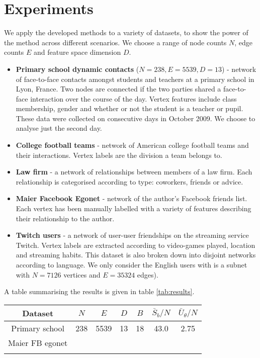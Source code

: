 \section{Experiments}

We apply the developed methods to a variety of datasets, to show the power of the method across different scenarios. We choose a range of node counts $N$, edge counts $E$ and feature space dimension $D$.

\begin{itemize}
	\item \textbf{Primary school dynamic contacts} \cite{schools} ($N=238, E=5539, D=13$) - network of face-to-face contacts amongst students and teachers at a primary school in Lyon, France. Two nodes are connected if the two parties shared a face-to-face interaction over the course of the day. Vertex features include class membership, gender and whether or not the student is a teacher or pupil. These data were collected on consecutive days in October 2009. We choose to analyse just the second day. 
	\item \textbf{College football teams} \cite{Evans_2010_football} - network of American college football teams and their interactions. Vertex labels are the division a team belongs to.
	\item \textbf{Law firm} \cite{LawFirm} - a network of relationships between members of a law firm. Each relationship is categorised according to type: coworkers, friends or advice.
	\item \textbf{Maier Facebook Egonet} \cite{FB-Maier} - network of the author's Facebook friends list. Each vertex has been manually labelled with a variety of features describing their relationship to the author.
	\item \textbf{Twitch users} \cite{twitch} - a network of user-user friendships on the streaming service Twitch. Vertex labels are extracted according to video-games played, location and streaming habits. This dataset is also broken down into disjoint networks according to language. We only consider the English users with is a subnet with $N=7126$ vertices and $E=35324$ edges).
\end{itemize}

A table summarising the results is given in table \ref{tab:results}.

\begin{table}[]
	\centering
	\begin{tabular}{c|ccc|c|cc}
		Dataset & $N$ & $E$ & $D$ & $B$ & $\bar{S}_b /N$ & $\bar{U}_\theta /N$ \\ \hline
		Primary school & 238 & 5539 & 13 &  18 & 43.0  & 2.75 \\
		Maier FB egonet &  &     &     &   &           &             \\
		&     &     &     &              &     &       
	\end{tabular}
\end{table}

